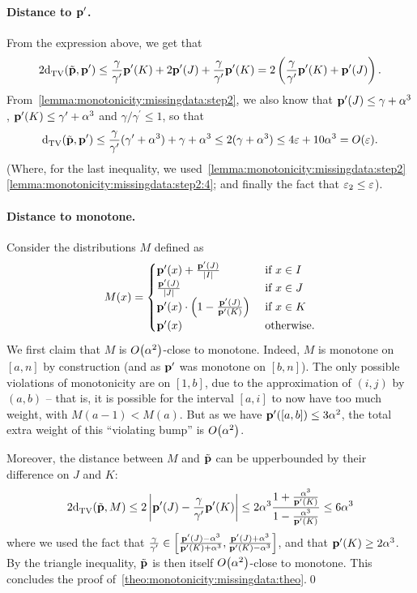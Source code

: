 \paragraph{Distance to $\mathbf{p}^\prime$.} From the expression above, we get that
\[
2{\operatorname{d}_{\textrm{TV}}^{}\!\left({\tilde{\mathbf{p}}, \mathbf{p}^\prime}\right)} \leq \frac{\gamma}{\gamma^\prime} \mathbf{p}^\prime(K) +  2\mathbf{p}^\prime(J) + \frac{\gamma}{\gamma^\prime} \mathbf{p}^\prime(K) = 2\left(\frac{\gamma}{\gamma^\prime} \mathbf{p}^\prime(K) + \mathbf{p}^\prime(J) \right).
\] 
From~\cref{lemma:monotonicity:missingdata:step2}, we also know that $\mathbf{p}^\prime(J) \leq \gamma+\alpha^3$, $\mathbf{p}^\prime(K) \leq \gamma^\prime+\alpha^3$ and $\gamma/\gamma^\prime \leq 1$, so that
\[
\totalvardist{\tilde{\D}}{\D^\prime} \leq \frac{\gamma}{\gamma^\prime} (\gamma^\prime+\alpha^3) + \gamma+\alpha^3 \leq 2(\gamma+\alpha^3) \leq 4\eps+10\alpha^3 = \bigO{\eps}.
\] 
(Where, for the last inequality, we used~\cref{lemma:monotonicity:missingdata:step2} \ref{lemma:monotonicity:missingdata:step2:4}; and finally the fact that $\varepsilon_2\leq \varepsilon$).

\paragraph{Distance to monotone.}

Consider the distributions $M$ defined as
\[
M(x) = \begin{cases}
 \mathbf{p}^\prime(x) + \frac{\mathbf{p}^\prime(J)}{\left\lvert I \right\rvert} & \text{ if } x\in I \\
 \frac{\mathbf{p}^\prime(J)}{\left\lvert J \right\rvert} & \text{ if } x\in J \\
 \mathbf{p}^\prime(x)\cdot\left(1-\frac{\mathbf{p}^\prime(J)}{\mathbf{p}^\prime(K)}\right) & \text{ if } x\in K \\
 \mathbf{p}^\prime(x) & \text{ otherwise.}
\end{cases}
\]
We first claim that $M$ is $\bigO{\alpha^2}$-close to monotone. Indeed, $M$ is monotone on $[a,n]$ by construction (and as $\mathbf{p}^\prime$ was monotone on $[b,n]$). The only possible violations of monotonicity are on $[1,b]$, due to the approximation of $(i,j)$ by $(a,b)$ -- that is, it is possible for the interval $[a,i]$ to now have too much weight, with $M(a-1) < M(a)$. But as we have $\mathbf{p}^\prime([a,b])\leq 3\alpha^2$, the total extra weight of this ``violating bump'' is $\bigO{\alpha^2}$.\medskip

Moreover, the distance between $M$ and $\tilde{\mathbf{p}}$ can be upperbounded by their difference on $J$ and $K$:
\begin{align*}
  2{\operatorname{d}_{\textrm{TV}}^{}\!\left({\tilde{\mathbf{p}}, M}\right)} \leq 2\left\lvert  \mathbf{p}^\prime(J) - \frac{\gamma}{\gamma^\prime} \mathbf{p}^\prime(K)  \right\rvert \leq 2\alpha^3\frac{1+\frac{\alpha^3}{\mathbf{p}^\prime(K)}}{1-\frac{\alpha^3}{\mathbf{p}^\prime(K)}} \leq 6\alpha^3
\end{align*}
where we used the fact that $\frac{\gamma}{\gamma^\prime} \in \left[\frac{\mathbf{p}^\prime(J)-\alpha^3}{\mathbf{p}^\prime(K) + \alpha^3}, \frac{\mathbf{p}^\prime(J)+\alpha^3}{\mathbf{p}^\prime(K) - \alpha^3}\right]$, and that $\mathbf{p}^\prime(K) \geq 2\alpha^3$. By the triangle inequality, $\tilde{\mathbf{p}}$ is then itself $\bigO{\alpha^2}$-close to monotone. This concludes the proof of~\cref{theo:monotonicity:missingdata:theo}.\qed
